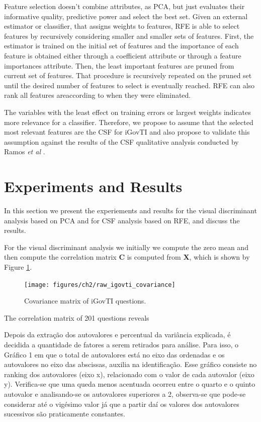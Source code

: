 Feature selection doesn't combine attributes, as PCA, but just evaluates their informative quality, predictive power and select the best set. Given an external estimator or classifier, that assigns weights to features, RFE is able to select features by recursively considering smaller and smaller sets of features. First, the estimator is trained on the initial set of features and the importance of each feature is obtained either through a coefficient attribute or through a feature importances attribute. Then, the least important features are pruned from current set of features. That procedure is recursively repeated on the pruned set until the desired number of features to select is eventually reached. RFE can also rank all features areaccording to when they were eliminated. 

The variables with the least effect on training errors or largest weights indicates more relevance for a classifier. Therefore, we propose to assume that the selected most relevant features are the CSF for iGovTI and also propose to validate this assumption against the results of the CSF qualitative analysis conducted by Ramos \emph{et al} \cite{ramos2016information}.

\section{Experiments and Results}
\label{sec:ch2_experimentalresults}

In this section we present the experiements and results for the visual discriminant analysis based on PCA and for CSF analysis based on RFE, and discuss the results.

For the visual discriminant analysis we initially we compute the zero mean and then compute the correlation matrix $\mathbf{C}$ is computed from $\mathbf{X}$, which is shown by Figure \ref{fig:ch2_fig1}.
 
\begin{figure}[h!]
     \centering 
     \texttt{[image: figures/ch2/raw\_igovti\_covariance]}
     \caption{Covariance matrix of iGovTI questions.}
     \label{fig:ch2_fig1}
\end{figure}

The correlation matrix of 201 questions reveals 

Depois da extração dos autovalores e percentual da variância explicada, é decidida a quantidade de fatores a serem retirados para análise. Para isso, o Gráfico 1 em que o total de autovalores está no eixo das ordenadas e os autovalores  no eixo das abscissas, auxilia na identificação. Esse gráfico consiste no ranking dos autovalores (eixo x), relacionado com o valor de cada autovalor (eixo y). Verifica-se que uma queda menos acentuada ocorreu entre o quarto e o quinto autovalor e analisando-se os autovalores superiores a 2, observa-se que pode-se considerar até o vigésimo valor já que a partir daí os valores dos autovalores sucessivos são praticamente constantes.

